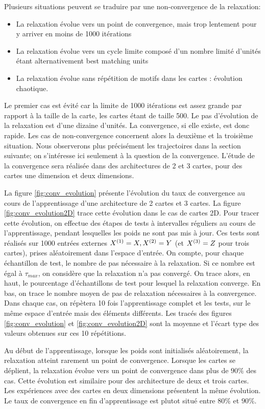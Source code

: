 \documentclass[../main]{subfiles}
\begin{document}
Plusieurs situations peuvent se traduire par une non-convergence de la relaxation:
\begin{itemize}
\item La relaxation évolue vers un point de convergence, mais trop lentement pour y arriver en moins de 1000 itérations
\item La relaxation évolue vers un cycle limite composé d'un nombre limité d'unités étant alternativement best matching units
\item La relaxation évolue sans répétition de motifs dans les cartes : évolution chaotique.
\end{itemize}
Le premier cas est évité car la limite de 1000 itérations est assez grande par rapport à la taille de la carte, les cartes étant de taille 500. Le pas d'évolution de la relaxation est d'une dizaine d'unités. La convergence, si elle existe, est donc rapide. Les cas de non-convergence concernent alors la deuxième et la troisième situation.
Nous observerons plus précisément les trajectoires dans la section suivante; on s'intéresse ici seulement à la question de la convergence.
L'étude de la convergence sera réalisée dans des architectures de 2 et 3 cartes, pour des cartes une dimension et deux dimensions.

La figure \ref{fig:conv_evolution} présente l'évolution du taux de convergence au cours de l'apprentissage d'une architecture de 2 cartes et 3 cartes. La figure \ref{fig:conv_evolution2D} trace  cette évolution dans le cas de cartes 2D. Pour tracer cette évolution, on effectue des étapes de tests à intervalles réguliers au cours de l'apprentissage, pendant lesquelles les poids ne sont pas mis à jour. Ces tests sont réalisés sur 1000 entrées externes $X^{({1})} = X, X^{({2})}=Y$ (et $X^{({3})}=Z$ pour trois cartes), prises aléatoirement dans l'espace d'entrée. 
On compte, pour chaque échantillon de test, le nombre de pas nécessaire à la relaxation. 
Si ce nombre est égal à $\tau_{max}$, on considère que la relaxation n'a pas convergé. 
On trace alors, en haut, le pourcentage d'échantillons de test pour lesquel la relaxation converge. En bas, on trace le nombre moyen de pas de relaxation nécessaires à la convergence.
Dans chaque cas, on répètera 10 fois l'apprentissage complet et les tests, sur le même espace d'entrée mais des éléments différents. Les tracés des figures \ref{fig:conv_evolution} et \ref{fig:conv_evolution2D} sont la moyenne et l'écart type des valeurs obtenues sur ces 10 répétitions.

Au début de l'apprentissage, lorsque les poids sont initialisés aléatoirement, la relaxation atteint rarement un point de convergence. Lorsque les cartes se déplient, la relaxation évolue vers un point de convergence dans plus de $90 \%$ des cas. Cette évolution est similaire pour des architecture de deux et trois cartes. Les expériences avec des cartes en deux dimensions présentent la même évolution. Le taux de convergence en fin d'apprentissage est plutot situé entre $80 \%$ et $90 \%$.
 
\end{document}
